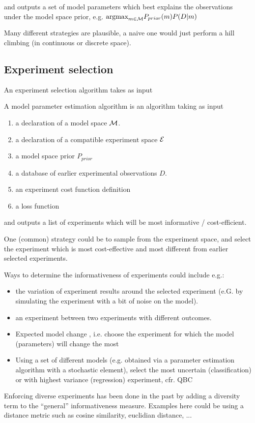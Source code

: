 \documentclass{article}
\begin{document}
and outputs a set of model parameters which best explains the observations under the model space prior, e.g.
$\hbox{argmax}_{m\in\mathcal{M}} P_{prior}(m)P(D|m)$

Many different strategies are plausible, a naive one would just perform a hill climbing (in continuous or discrete space).



\subsection{Experiment selection}

An experiment selection algorithm takes as input


A model parameter estimation algorithm is an algorithm taking as input
\begin{enumerate}
\item a declaration of a model space $\mathcal{M}$.
\item a declaration of a compatible experiment space $\mathcal{E}$
\item a model space prior $P_{prior}$
\item a database of earlier experimental observations $D$.
\item an experiment cost function definition
\item a loss function
\end{enumerate}

and outputs a list of experiments which will be most informative / cost-efficient.

One (common) strategy could be to sample from the experiment space, and select the experiment which is most cost-effective and most different from earlier selected experiments.

Ways to determine the informativeness of experiments could include e.g.:
\begin{itemize}
\item the variation of experiment results around the selected experiment (e.G. by simulating the experiment with a bit of noise on the model).
\item an experiment between two experiments with different outcomes.
\item Expected model change \cite{cai2013maximizing}, i.e. choose the experiment for which the model (parameters) will change the most
\item Using a set of different models (e.g. obtained via a parameter estimation algorithm with a stochastic element), select the most uncertain (classification) or with highest variance (regression) experiment, cfr. QBC
\end{itemize}
Enforcing diverse experiments has been done in the past \cite{xu2007incorporating} by adding a diversity term to the ``general'' informativeness measure. Examples here could be using a distance metric such as cosine similarity, euclidian distance, ...
 
\end{document}
